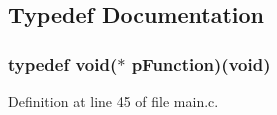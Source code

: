 \subsection{\-Typedef \-Documentation}
\hypertarget{group___discovery_f4_b_l_ga9227bf1f1a9c633a0cc9ca50cc761c1a}{
\subsubsection[{p\-Function}]{\setlength{\rightskip}{0pt plus 5cm}typedef void($\ast$ {\bf p\-Function})(void)}}\label{group___discovery_f4_b_l_ga9227bf1f1a9c633a0cc9ca50cc761c1a}


\-Definition at line 45 of file main.\-c.



